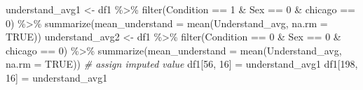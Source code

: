 \documentclass[
  letterpaper,
  DIV=11,
  numbers=noendperiod]{scrartcl}
\newenvironment{Shaded}{\begin{snugshade}}{\end{snugshade}}
\newcommand{\AttributeTok}[1]{\textcolor[rgb]{0.49,0.56,0.16}{#1}}
\newcommand{\CommentTok}[1]{\textcolor[rgb]{0.38,0.63,0.69}{\textit{#1}}}
\newcommand{\ConstantTok}[1]{\textcolor[rgb]{0.53,0.00,0.00}{#1}}
\newcommand{\DecValTok}[1]{\textcolor[rgb]{0.25,0.63,0.44}{#1}}
\newcommand{\FunctionTok}[1]{\textcolor[rgb]{0.02,0.16,0.49}{#1}}
\newcommand{\NormalTok}[1]{\textcolor[rgb]{0.00,0.44,0.13}{#1}}
\newcommand{\OtherTok}[1]{\textcolor[rgb]{0.00,0.44,0.13}{#1}}
\newcommand{\SpecialCharTok}[1]{\textcolor[rgb]{0.25,0.44,0.63}{#1}}
\begin{document}
\begin{Shaded}
\begin{Highlighting}[]
\NormalTok{understand\_avg1 }\OtherTok{\textless{}{-}}\NormalTok{ df1 }\SpecialCharTok{\%\textgreater{}\%} \FunctionTok{filter}\NormalTok{(Condition }\SpecialCharTok{==} \DecValTok{1} \SpecialCharTok{\&}\NormalTok{ Sex }\SpecialCharTok{==} \DecValTok{0} \SpecialCharTok{\&}\NormalTok{ chicago }\SpecialCharTok{==} \DecValTok{0}\NormalTok{) }\SpecialCharTok{\%\textgreater{}\%} \FunctionTok{summarize}\NormalTok{(}\AttributeTok{mean\_understand =} \FunctionTok{mean}\NormalTok{(Understand\_avg, }\AttributeTok{na.rm =} \ConstantTok{TRUE}\NormalTok{))}
\NormalTok{understand\_avg2 }\OtherTok{\textless{}{-}}\NormalTok{ df1 }\SpecialCharTok{\%\textgreater{}\%} \FunctionTok{filter}\NormalTok{(Condition }\SpecialCharTok{==} \DecValTok{0} \SpecialCharTok{\&}\NormalTok{ Sex }\SpecialCharTok{==} \DecValTok{0} \SpecialCharTok{\&}\NormalTok{ chicago }\SpecialCharTok{==} \DecValTok{0}\NormalTok{) }\SpecialCharTok{\%\textgreater{}\%} \FunctionTok{summarize}\NormalTok{(}\AttributeTok{mean\_understand =} \FunctionTok{mean}\NormalTok{(Understand\_avg, }\AttributeTok{na.rm =} \ConstantTok{TRUE}\NormalTok{))}
\CommentTok{\# assign imputed value}
\NormalTok{df1[}\DecValTok{56}\NormalTok{, }\DecValTok{16}\NormalTok{] }\OtherTok{=}\NormalTok{ understand\_avg1}
\NormalTok{df1[}\DecValTok{198}\NormalTok{, }\DecValTok{16}\NormalTok{] }\OtherTok{=}\NormalTok{ understand\_avg1}
\end{Highlighting}
\end{Shaded}
\end{document}
